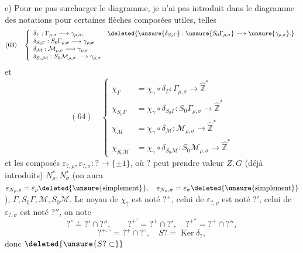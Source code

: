 e) Pour ne pas surcharger le diagramme, je n'ai pas introduit dans
le diagramme des notations pour certaines flèches composées utiles,
telles
\[
(63)\quad
\left\{
\begin{array}{ll}
\delta_\Gamma:\Gamma_{\rho,\sigma}\longrightarrow\gamma_{\rho,\sigma},
&
\deleted{\unsure{\delta_{S_0\Gamma}}:
\unsure{S_0\Gamma_{\rho,\sigma}}\longrightarrow
\unsure{\gamma_{\rho,\sigma}}.}\\
\delta_{S_0\Gamma}:S_0\Gamma_{\rho,\sigma}
\longrightarrow\gamma_{\rho,\sigma}&\\
\delta_{\mathcal M}:\mathcal M_{\rho,\sigma}
\longrightarrow\gamma_{\rho,\sigma}&\\
\delta_{S_0\mathcal M}:S_0\mathcal M_{\rho,\sigma}
\longrightarrow\gamma_{\rho,\sigma}&
\end{array}
\right.
\]
et
\[
(64)\quad
\left\{
\begin{aligned}
\chi_\Gamma&=\chi_\gamma\circ\delta_\Gamma:
\Gamma_{\rho,\sigma}\longrightarrow\widehat{\mathbb Z}^{*}\\
\chi_{S_0\Gamma}&=\chi_\gamma\circ\delta_{S_0\Gamma}:
S_0\Gamma_{\rho,\sigma}\longrightarrow\widehat{\mathbb Z}^{*}\\
\chi_{\mathcal M}&=\chi_\gamma\circ\delta_{\mathcal M}:
\mathcal M_{\rho,\sigma}\longrightarrow\widehat{\mathbb Z}^{*}\\
\chi_{S_0\mathcal M}&=\chi_\gamma\circ\delta_{S_0\mathcal M}:
S_0\mathcal M_{\rho,\sigma}\longrightarrow\widehat{\mathbb Z}^{*}
\end{aligned}
\right.
\]
et les composés
\(\varepsilon_{?,\rho},\varepsilon_{?,\sigma}:?\longrightarrow\{\pm1\}\),
où \(?\) peut prendre  valeur
\(Z,G\) (déjà introduits) \(N_\rho^*,N_\sigma^*\)
(on aura
\(\varepsilon_{N_\rho,\rho}=\varepsilon_\rho
\deleted{\text{\unsure{simplement}}},\quad
\varepsilon_{N_\sigma,\sigma}=\varepsilon_\sigma
\deleted{\text{\unsure{simplement}}}\)),
\(\Gamma,S_0\Gamma,\mathcal M,S_0\mathcal M\).
Le noyau de \(\chi_?\) est noté \(?^+\), celui de
\(\varepsilon_{?,\rho}\) est noté \(?'\), celui de
\(\varepsilon_{?,\sigma}\) est noté \(?''\),
on note
\[
?^\circ\doteq?'\cap?'',\qquad
?^{+'}=?^+\cap?',\quad
?^{+''}=?^+\cap?'',
\]
\[
?^{+,\circ}=?^+\cap?^\circ,\quad
S?=\operatorname{Ker}\delta_?,
\]
 donc \(\deleted{\unsure{S?\subset}}\)


